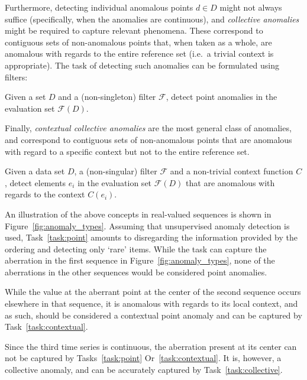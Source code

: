 Furthermore, detecting individual anomalous points $d \in D$ might not always suffice (specifically, when the anomalies are continuous), and \emph{collective anomalies} might be required to capture relevant phenomena. These correspond to contiguous sets of non-anomalous points that, when taken as a whole, are anomalous with regards to the entire reference set (i.e.\ a trivial context is appropriate). The task of detecting such anomalies can be formulated using filters:

\begin{task}
\label{task:collective}
  Given a set $D$ and a (non-singleton) filter $\mathcal{F}$, detect point anomalies in the evaluation set $\mathcal{F}(D)$.
\end{task}

Finally, \emph{contextual collective anomalies} are the most general class of anomalies, and correspond to contiguous sets of non-anomalous points that are anomalous with regard to a specific context but not to the entire reference set.

\begin{task}
\label{task:contextual_power}
  Given a data set $D$, a (non-singular) filter $\mathcal{F}$ and a non-trivial context function $C$, detect elements $e_i$ in the evaluation set $\mathcal{F}(D)$ that are anomalous with regards to the context $C(e_i)$.
\end{task}

An illustration of the above concepts in real-valued sequences is shown in Figure~\ref{fig:anomaly_types}. Assuming that unsupervised anomaly detection is used, Task~\ref{task:point} amounts to disregarding the information provided by the ordering and detecting only `rare' items. While the task can capture the aberration in the first sequence in Figure~\ref{fig:anomaly_types}, none of the aberrations in the other sequences would be considered point anomalies.

While the value at the aberrant point at the center of the second sequence occurs elsewhere in that sequence, it is anomalous with regards to its local context, and as such, should be considered a contextual point anomaly and can be captured by Task~\ref{task:contextual}.

Since the third time series is continuous, the aberration present at its center can not be captured by Tasks~\ref{task:point} Or~\ref{task:contextual}. It is, however, a collective anomaly, and can be accurately captured by Task~\ref{task:collective}.

